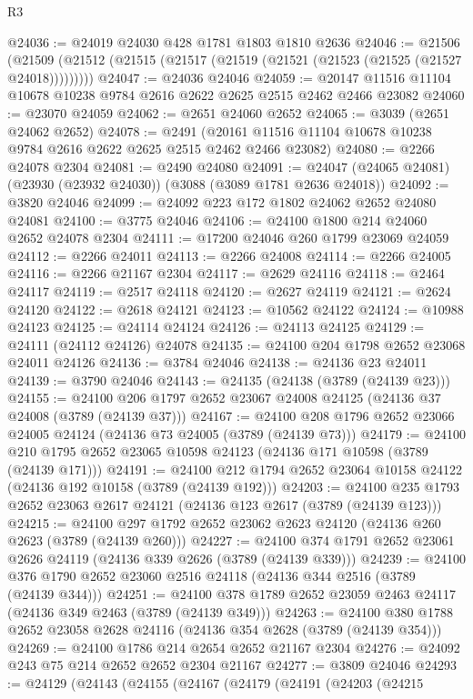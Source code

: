\begin{lexlean}{R3}
\begin{coremodule}
@24036 := @24019 @24030 @428 @1781 @1803 @1810 @2636
@24046 := @21506
    (@21509 (@21512 (@21515 (@21517 (@21519 (@21521 (@21523 (@21525 (@21527 @24018)))))))))
@24047 := @24036 @24046
@24059 := @20147 @11516 @11104 @10678 @10238 @9784 @2616 @2622 @2625 @2515 @2462 @2466 @23082
@24060 := @23070 @24059
@24062 := @2651 @24060 @2652
@24065 := @3039 (@2651 @24062 @2652)
@24078 := @2491
    (@20161 @11516 @11104 @10678 @10238 @9784 @2616 @2622 @2625 @2515 @2462 @2466 @23082)
@24080 := @2266 @24078 @2304
@24081 := @2490 @24080
@24091 := @24047 (@24065 @24081) (@23930 (@23932 @24030)) (@3088 (@3089 @1781 @2636 @24018))
@24092 := @3820 @24046
@24099 := @24092 @223 @172 @1802 @24062 @2652 @24080 @24081
@24100 := @3775 @24046
@24106 := @24100 @1800 @214 @24060 @2652 @24078 @2304
@24111 := @17200 @24046 @260 @1799 @23069 @24059
@24112 := @2266 @24011
@24113 := @2266 @24008
@24114 := @2266 @24005
@24116 := @2266 @21167 @2304
@24117 := @2629 @24116
@24118 := @2464 @24117
@24119 := @2517 @24118
@24120 := @2627 @24119
@24121 := @2624 @24120
@24122 := @2618 @24121
@24123 := @10562 @24122
@24124 := @10988 @24123
@24125 := @24114 @24124
@24126 := @24113 @24125
@24129 := @24111 (@24112 @24126) @24078
@24135 := @24100 @204 @1798 @2652 @23068 @24011 @24126
@24136 := @3784 @24046
@24138 := @24136 @23 @24011
@24139 := @3790 @24046
@24143 := @24135 (@24138 (@3789 (@24139 @23)))
@24155 := @24100 @206 @1797 @2652 @23067 @24008 @24125 (@24136 @37 @24008 (@3789 (@24139 @37)))
@24167 := @24100 @208 @1796 @2652 @23066 @24005 @24124 (@24136 @73 @24005 (@3789 (@24139 @73)))
@24179 := @24100 @210 @1795 @2652 @23065 @10598 @24123 (@24136 @171 @10598 (@3789 (@24139 @171)))
@24191 := @24100 @212 @1794 @2652 @23064 @10158 @24122 (@24136 @192 @10158 (@3789 (@24139 @192)))
@24203 := @24100 @235 @1793 @2652 @23063 @2617 @24121 (@24136 @123 @2617 (@3789 (@24139 @123)))
@24215 := @24100 @297 @1792 @2652 @23062 @2623 @24120 (@24136 @260 @2623 (@3789 (@24139 @260)))
@24227 := @24100 @374 @1791 @2652 @23061 @2626 @24119 (@24136 @339 @2626 (@3789 (@24139 @339)))
@24239 := @24100 @376 @1790 @2652 @23060 @2516 @24118 (@24136 @344 @2516 (@3789 (@24139 @344)))
@24251 := @24100 @378 @1789 @2652 @23059 @2463 @24117 (@24136 @349 @2463 (@3789 (@24139 @349)))
@24263 := @24100 @380 @1788 @2652 @23058 @2628 @24116 (@24136 @354 @2628 (@3789 (@24139 @354)))
@24269 := @24100 @1786 @214 @2654 @2652 @21167 @2304
@24276 := @24092 @243 @75 @214 @2652 @2652 @2304 @21167
@24277 := @3809 @24046
@24293 := @24129
    (@24143
      (@24155
        (@24167
          (@24179
            (@24191
              (@24203
                (@24215

\end{coremodule}
\end{lexlean}
